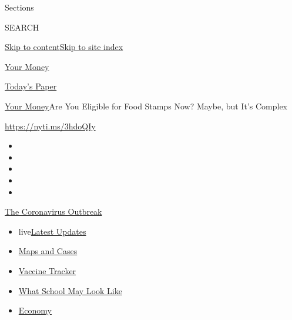 Sections

SEARCH

\protect\hyperlink{site-content}{Skip to
content}\protect\hyperlink{site-index}{Skip to site index}

\href{https://www.nytimes3xbfgragh.onion/section/your-money}{Your Money}

\href{https://myaccount.nytimes3xbfgragh.onion/auth/login?response_type=cookie\&client_id=vi}{}

\href{https://www.nytimes3xbfgragh.onion/section/todayspaper}{Today's
Paper}

\href{/section/your-money}{Your Money}\textbar{}Are You Eligible for
Food Stamps Now? Maybe, but It's Complex

\url{https://nyti.ms/3hdoQIy}

\begin{itemize}
\item
\item
\item
\item
\item
\end{itemize}

\href{https://www.nytimes3xbfgragh.onion/news-event/coronavirus?action=click\&pgtype=Article\&state=default\&region=TOP_BANNER\&context=storylines_menu}{The
Coronavirus Outbreak}

\begin{itemize}
\tightlist
\item
  live\href{https://www.nytimes3xbfgragh.onion/2020/08/01/world/coronavirus-covid-19.html?action=click\&pgtype=Article\&state=default\&region=TOP_BANNER\&context=storylines_menu}{Latest
  Updates}
\item
  \href{https://www.nytimes3xbfgragh.onion/interactive/2020/us/coronavirus-us-cases.html?action=click\&pgtype=Article\&state=default\&region=TOP_BANNER\&context=storylines_menu}{Maps
  and Cases}
\item
  \href{https://www.nytimes3xbfgragh.onion/interactive/2020/science/coronavirus-vaccine-tracker.html?action=click\&pgtype=Article\&state=default\&region=TOP_BANNER\&context=storylines_menu}{Vaccine
  Tracker}
\item
  \href{https://www.nytimes3xbfgragh.onion/interactive/2020/07/29/us/schools-reopening-coronavirus.html?action=click\&pgtype=Article\&state=default\&region=TOP_BANNER\&context=storylines_menu}{What
  School May Look Like}
\item
  \href{https://www.nytimes3xbfgragh.onion/live/2020/07/31/business/stock-market-today-coronavirus?action=click\&pgtype=Article\&state=default\&region=TOP_BANNER\&context=storylines_menu}{Economy}
\end{itemize}

